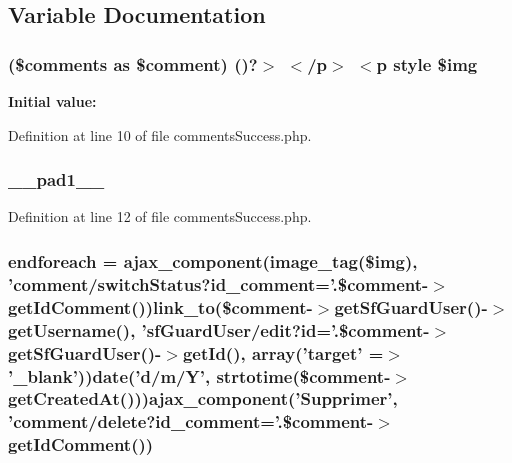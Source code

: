 \subsection{Variable Documentation}
\hypertarget{comments_success_8php_a77e427c53a11cc33159e8e019202ef61}{
\subsubsection[{\$img}]{ (\$comments as \$comment) ()?$>$ $<$/p$>$ $<$p {\bf style} \$img}}\label{comments_success_8php_a77e427c53a11cc33159e8e019202ef61}
{\bfseries Initial value\-:}


Definition at line 10 of file comments\-Success.\-php.

\hypertarget{comments_success_8php_ae8b4bb1441c6ab4dcb28a37bc46c8ead}{
\subsubsection[{\-\_\-\-\_\-pad1\-\_\-\-\_\-}]{ \-\_\-\-\_\-pad1\-\_\-\-\_\-}}\label{comments_success_8php_ae8b4bb1441c6ab4dcb28a37bc46c8ead}


Definition at line 12 of file comments\-Success.\-php.

\hypertarget{comments_success_8php_a672d9707ef91db026c210f98cc601123}{
\subsubsection[{endforeach}]{\setlength{\rightskip}{0pt plus 5cm}endforeach = ajax\-\_\-component(image\-\_\-tag(\$img), 'comment/switch\-Status?id\-\_\-comment='.\$comment-\/$>$get\-Id\-Comment())link\-\_\-to(\$comment-\/$>$get\-Sf\-Guard\-User()-\/$>$get\-Username(), 'sf\-Guard\-User/edit?{\bf id}='.\$comment-\/$>$get\-Sf\-Guard\-User()-\/$>$get\-Id(), array('target' =$>$ '\-\_\-blank'))date('d/{\bf m}/Y', strtotime(\$comment-\/$>${\bf get\-Created\-At}()))ajax\-\_\-component('Supprimer', 'comment/delete?id\-\_\-comment='.\$comment-\/$>$get\-Id\-Comment())}}\label{comments_success_8php_a672d9707ef91db026c210f98cc601123}


